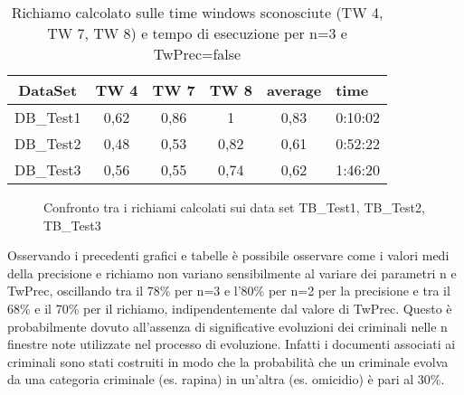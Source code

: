 \begin{table}[H]
	\centering
	\footnotesize
	\begin{tabular}{|cccccp{}|}
	\hline
	\textbf{DataSet} & \textbf{TW 4} & \textbf{ TW 7} & \textbf{TW 8} & \textbf{average} & \textbf{time}\\
	\hline 
	DB\_Test1 & 0,62 & 0,86 & 1 & 0,83 & 0:10:02\\ 
	DB\_Test2 & 0,48 & 0,53 & 0,82 & 0,61 & 0:52:22\\ 
	DB\_Test3 & 0,56 & 0,55 & 0,74 & 0,62 & 1:46:20\\ 
	\hline 
	\end{tabular}
	\caption{Richiamo calcolato  sulle time windows sconosciute (TW 4, TW 7, TW 8) e tempo di esecuzione per n=3 e TwPrec=false}
\end{table}

\begin{figure}[H]
\centering
{}\qquad
{}
\qquad
{}
\caption{Confronto tra i richiami calcolati sui data set TB\_Test1, TB\_Test2, TB\_Test3}
\end{figure}

Osservando i precedenti grafici e tabelle è possibile osservare come i valori medi della precisione e richiamo non variano sensibilmente al variare dei parametri n e TwPrec, oscillando tra il 78\% per n=3 e l'80\% per n=2 per la precisione e tra il 68\% e il 70\% per il richiamo, indipendentemente dal valore di TwPrec. Questo è probabilmente dovuto all'assenza di significative evoluzioni dei criminali nelle n finestre note utilizzate nel processo di evoluzione. Infatti i documenti associati ai criminali sono stati costruiti in modo che la probabilità che un criminale evolva da una categoria criminale (es. rapina) in un'altra (es. omicidio) è pari al 30\%. 


